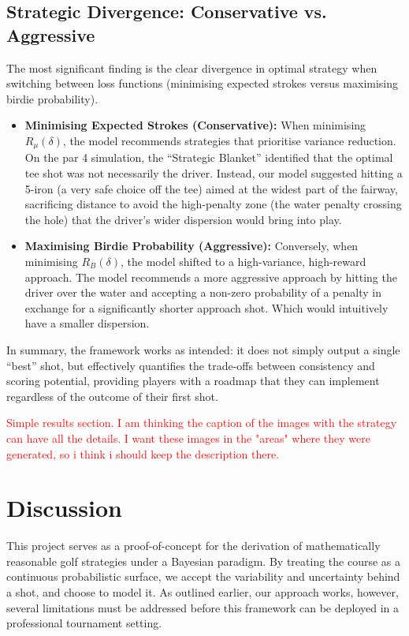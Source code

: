 \documentclass[11pt, letterpaper]{article}
\begin{document}
\subsection{Strategic Divergence: Conservative vs. Aggressive}
The most significant finding is the clear divergence in optimal strategy when switching between loss functions (minimising expected strokes versus maximising birdie probability).

\begin{itemize}
    \item \textbf{Minimising Expected Strokes (Conservative):} When minimising $R_\mu(\delta)$, the model recommends strategies that prioritise variance reduction. On the par 4 simulation, the ``Strategic Blanket'' identified that the optimal tee shot was not necessarily the driver. Instead, our model suggested hitting a 5-iron (a very safe choice off the tee) aimed at the widest part of the fairway, sacrificing distance to avoid the high-penalty zone (the water penalty crossing the hole) that the driver's wider dispersion would bring into play. 
    
    \item \textbf{Maximising Birdie Probability (Aggressive):} Conversely, when minimising $R_B(\delta)$, the model shifted to a high-variance, high-reward approach. The model recommends a more aggressive approach by hitting the driver over the water and accepting a non-zero probability of a penalty in exchange for a significantly shorter approach shot. Which would intuitively have a smaller dispersion.
\end{itemize}

In summary, the framework works as intended: it does not simply output a single ``best'' shot, but effectively quantifies the trade-offs between consistency and scoring potential, providing players with a roadmap that they can implement regardless of the outcome of their first shot.

\textcolor{red}{Simple results section. I am thinking the caption of the images with the strategy can have all the details. I want these images in the "areas" where they were generated, so i think i should keep the description there.}

\section{Discussion}
\label{sec:Discussion}

This project serves as a proof-of-concept for the derivation of mathematically reasonable golf strategies under a Bayesian paradigm. By treating the course as a continuous probabilistic surface, we accept the variability and uncertainty behind a shot, and choose to model it. As outlined earlier, our approach works, however, several limitations must be addressed before this framework can be deployed in a professional tournament setting.
\end{document}
